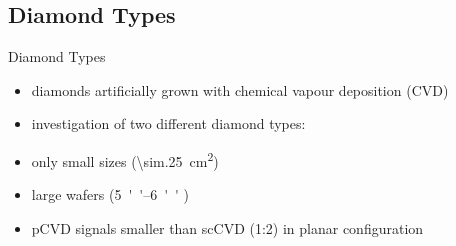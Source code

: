 \subsection{Diamond Types}
\begin{frame}{Diamond Types}

	\begin{itemize}\itemfill
		\item diamonds artificially grown with chemical vapour deposition (CVD)
		\item investigation of two different diamond types:
	\end{itemize}
	
	
	\hspace*{10pt}
	\begin{minipage}{5.5cm}
		\begin{itemize}
			\item only small sizes (\SI{\sim.25}{cm^2})
		\end{itemize}
	\end{minipage}
	\hspace*{2pt}
	\begin{minipage}{5.5cm}
		\begin{itemize}
			\item large wafers (\SIrange{5}{6}{''} \diameter)
		\end{itemize}
	\end{minipage}
	
	\begin{itemize}
		\item pCVD signals smaller than scCVD (1:2) in planar configuration
	\end{itemize}

	
\end{frame}

